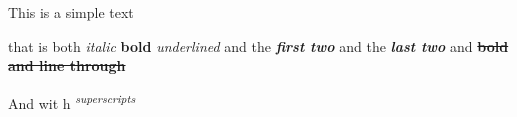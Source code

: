 This is a simple text

that is both \emph{ italic }\textbf{ bold }\emph{ underlined } and the
\emph{\textbf{ first two }} and the \emph{\textbf{ last two }} and
\textbf{\sout{ bold and line through }}

And wit h \textsuperscript{\emph{ superscripts }}
